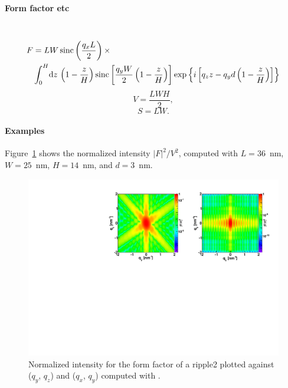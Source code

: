\paragraph{Form factor etc}\strut\\
\begin{align*}
F &=L W
\operatorname{sinc}\left(\frac{q_xL}{2}\right)\times \\ &
\int_0^H \!\text{d} z\,
\left(1-\frac{z}{H}\right)
 \operatorname{sinc}\left[\frac{q_y
    W}{2}\left(1-\frac{z}{H}\right)\right] 
\exp\left\{ i\left[q_zz -
    q_yd\left(1-\frac{z}{H}\right)\right]\right\}
\end{align*}
\begin{equation*}
  V = \dfrac{L W H}{2},
\end{equation*}
\begin{equation*}
  S = L W.
\end{equation*}

\paragraph{Examples}
Figure~\ref{fig:FFripple2Ex} shows the normalized intensity
$|F|^2/V^2$, computed with $L=36$~nm, $W=25$~nm, $H=14$~nm, and $d=3$~nm.

\begin{figure}[h]
\begin{center}
\includegraphics[angle=-90,width=\textwidth]{fig/ff/figffripple2.pdf}
\end{center}
\caption{Normalized intensity for the form factor of a ripple2 plotted against ($q_y$, $q_z$) and  ($q_x$, $q_y$)
  computed with .}
\label{fig:FFripple2Ex}
\end{figure}

